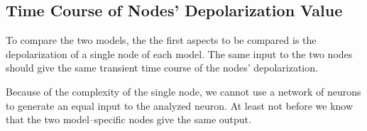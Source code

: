 	\subsection{Time Course of Nodes' Depolarization Value}

To compare %
			the two models, the the first aspects to be compared is the depolarization  of a single node of each model.
The same input to the two nodes should give the same transient time course of the nodes' depolarization.

Because of the complexity of the single node, we cannot use a network of neurons to generate an equal input to the analyzed neuron. 
At least not before we know that the two model--specific nodes give the same output. %

%
%
%

